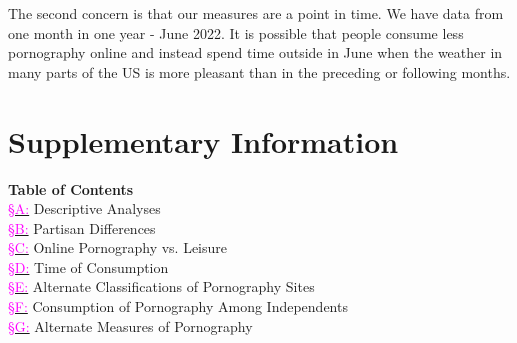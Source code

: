 \documentclass[12pt,twoside]{article}
\begin{document}
The second concern is that our measures are a point in time. We have data from one month in one year - June 2022. It is possible that people consume less pornography online and instead spend time outside in June when the weather in many parts of the US is more pleasant than in the preceding or following months. 







\clearpage
\setcounter{table}{0}
\setcounter{figure}{0}
\setcounter{equation}{0}

\setcounter{secnumdepth}{0}
\section[Supplementary Information]{\large Supplementary Information}\label{sec:sm}
\normalsize

\newcommand{\smATitle}{Descriptive Analyses}
\newcommand{\smCTitle}{Online Pornography vs. Leisure}
\newcommand{\smBTitle}{Partisan Differences}
\newcommand{\smETitle}{Alternate Classifications of Pornography Sites}
\newcommand{\smGTitle}{Alternate Measures of Pornography}
\newcommand{\smFTitle}{Consumption of Pornography Among Independents}
\newcommand{\smDTitle}{Time of Consumption}

\textbf{\hphantom{aaa}Table of Contents}\\
\hyperref[sm:smA]{\indent \textcolor{magenta}{\S A:}} \smATitle{}\\
\hyperref[sm:smB]{\indent \textcolor{magenta}{\S B:}} \smBTitle{}\\
\hyperref[sm:smC]{\indent \textcolor{magenta}{\S C:}} \smCTitle{}\\
\hyperref[sm:smD]{\indent \textcolor{magenta}{\S D:}} \smDTitle{}\\
\hyperref[sm:smE]{\indent \textcolor{magenta}{\S E:}} \smETitle{}\\
\hyperref[sm:smF]{\indent \textcolor{magenta}{\S F:}} \smFTitle{}\\
\hyperref[sm:smG]{\indent \textcolor{magenta}{\S G:}} \smGTitle{}\\
\end{document}
